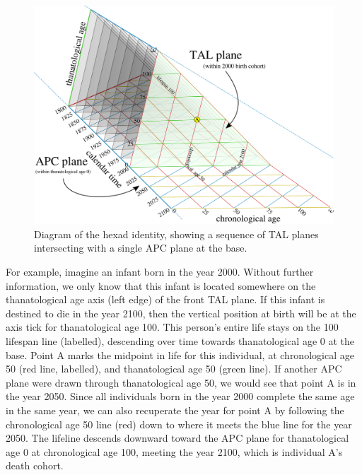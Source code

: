 \documentclass{bmcart}
\theoremstyle{definition}
\begin{document}
\begin{figure}[!h]
\centering
\caption[cap]{Diagram of the hexad identity, showing a sequence of TAL
planes intersecting with a single APC plane at the base.}
\label{fig:apctTAL}
\includegraphics[scale=.5]{Fig6.png}
\end{figure}

For example, imagine an infant born in the year 2000. Without further
information, we only know that this infant is located somewhere on the
thanatological age axis (left edge) of the front TAL plane. If this infant is
destined to die in the year 2100, then the vertical position at birth will be at the axis tick for thanatological age 100. This
person's entire life stays on the 100 lifespan line (labelled),
descending over time towards thanatological age 0 at the base. Point A marks the
midpoint in life for this individual, at chronological age 50 (red line, labelled), and
thanatological age 50 (green line). If another APC plane were drawn through thanatological age 50, we would see that point A is in the year 2050. Since all individuals born in the year 2000 complete the same age in the same year, we can
also recuperate the year for point A by following the chronological age 50 line
(red) down to where it meets the blue line for the year 2050. The lifeline
descends downward toward the APC plane for thanatological age 0 at chronological
age 100, meeting the year 2100, which is individual A's death cohort.
\end{document}
